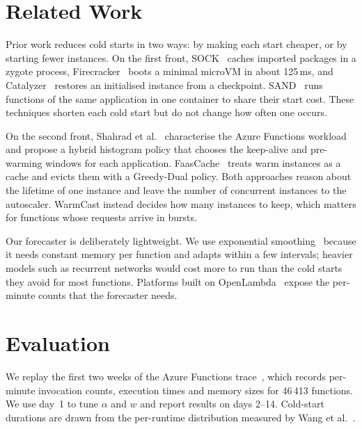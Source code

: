 \documentclass[10pt]{article}
\begin{document}
\section{Related Work}
\label{sec:related}

Prior work reduces cold starts in two ways: by making each start
cheaper, or by starting fewer instances. On the first front,
SOCK~\cite{oakes2018sock} caches imported packages in a zygote
process, Firecracker~\cite{agache2020firecracker} boots a minimal
microVM in about 125\,ms, and Catalyzer~\cite{du2020catalyzer}
restores an initialised instance from a checkpoint.
SAND~\cite{akkus2018sand} runs functions of the same application in
one container to share their start cost. These techniques shorten
each cold start but do not change how often one occurs.

On the second front, Shahrad et al.~\cite{shahrad2020serverless} characterise
the Azure Functions workload and propose a hybrid histogram policy that
chooses the keep-alive and pre-warming windows for each application.
FaasCache~\cite{fuerst2021faascache} treats warm instances as a cache and
evicts them with a Greedy-Dual policy. Both approaches reason about the
lifetime of one instance and leave the number of concurrent instances to the
autoscaler. WarmCast instead decides how many instances to keep,
which matters for functions whose requests arrive in bursts.

Our forecaster is deliberately lightweight. We use exponential
smoothing~\cite{hyndman2021forecasting} because it needs constant memory per
function and adapts within a few intervals; heavier models such as recurrent
networks would cost more to run than the cold starts they avoid for most
functions. Platforms built on OpenLambda~\cite{hendrickson2016openlambda}
expose the per-minute counts that the forecaster needs.



\section{Evaluation}
\label{sec:eval}

We replay the first two weeks of the Azure Functions
trace~\cite{shahrad2020serverless}, which records per-minute invocation
counts, execution times and memory sizes for 46\,413 functions. We use day~1
to tune $\alpha$ and $w$ and report results on days 2--14. Cold-start
durations are drawn from the per-runtime distribution measured by Wang et
al.~\cite{wang2018peeking}.
\end{document}
